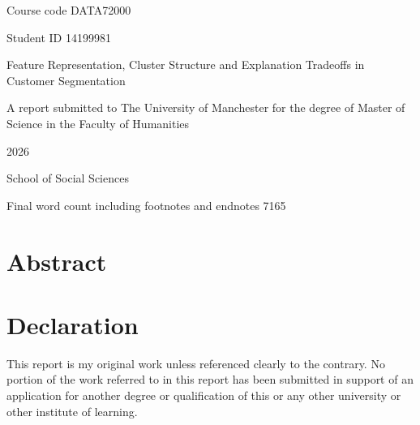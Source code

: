 \documentclass[12pt,a4paper,oneside]{report}
\newcommand{\DissertationTitle}{Feature Representation, Cluster Structure and Explanation Tradeoffs in Customer Segmentation}
\newcommand{\FinalWordCount}{7165}
\newcommand{\CourseCode}{DATA72000}
\newcommand{\StudentID}{14199981}
\newcommand{\SubmissionYear}{2026}
\begin{document}
\setcounter{page}{1}

\begin{titlepage}
\thispagestyle{empty}
\begin{flushright}
{\large Course code \CourseCode\par}
{\large Student ID \StudentID\par}
\end{flushright}
\centering
\vspace*{18mm}
{\Large\mdseries \DissertationTitle\par}
\vfill
{\large A report submitted to The University of Manchester for the degree of Master of Science in the Faculty of Humanities\par}
\vfill
{\large \SubmissionYear\par}
\vspace{24mm}
{\large School of Social Sciences\par}
\vspace*{20mm}
\end{titlepage}

\clearpage
\setcounter{page}{2}
\tableofcontents
\vfill
\noindent Final word count including footnotes and endnotes \FinalWordCount
\clearpage

\listoftables
\clearpage
\listoffigures
\clearpage

\chapter*{Abstract}

\clearpage

\chapter*{Declaration}
This report is my original work unless referenced clearly to the contrary. No portion of the work referred to in this report has been submitted in support of an application for another degree or qualification of this or any other university or other institute of learning.
\clearpage
\end{document}
